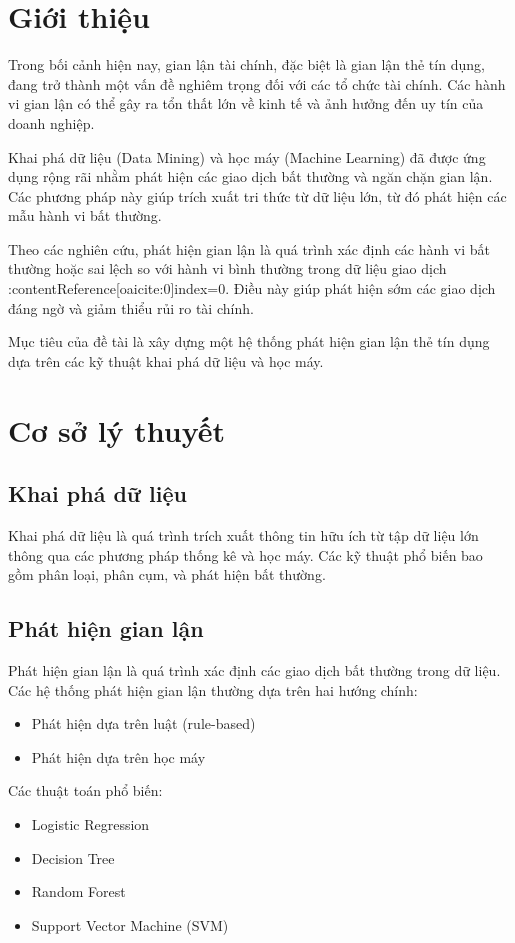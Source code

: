 \section{Giới thiệu}

Trong bối cảnh hiện nay, gian lận tài chính, đặc biệt là gian lận thẻ tín dụng, đang trở thành một vấn đề nghiêm trọng đối với các tổ chức tài chính. Các hành vi gian lận có thể gây ra tổn thất lớn về kinh tế và ảnh hưởng đến uy tín của doanh nghiệp.

Khai phá dữ liệu (Data Mining) và học máy (Machine Learning) đã được ứng dụng rộng rãi nhằm phát hiện các giao dịch bất thường và ngăn chặn gian lận. Các phương pháp này giúp trích xuất tri thức từ dữ liệu lớn, từ đó phát hiện các mẫu hành vi bất thường.

Theo các nghiên cứu, phát hiện gian lận là quá trình xác định các hành vi bất thường hoặc sai lệch so với hành vi bình thường trong dữ liệu giao dịch :contentReference[oaicite:0]{index=0}. Điều này giúp phát hiện sớm các giao dịch đáng ngờ và giảm thiểu rủi ro tài chính.

Mục tiêu của đề tài là xây dựng một hệ thống phát hiện gian lận thẻ tín dụng dựa trên các kỹ thuật khai phá dữ liệu và học máy.
\section{Cơ sở lý thuyết}

\subsection{Khai phá dữ liệu}
Khai phá dữ liệu là quá trình trích xuất thông tin hữu ích từ tập dữ liệu lớn thông qua các phương pháp thống kê và học máy. Các kỹ thuật phổ biến bao gồm phân loại, phân cụm, và phát hiện bất thường.

\subsection{Phát hiện gian lận}
Phát hiện gian lận là quá trình xác định các giao dịch bất thường trong dữ liệu. Các hệ thống phát hiện gian lận thường dựa trên hai hướng chính:
\begin{itemize}
    \item Phát hiện dựa trên luật (rule-based)
    \item Phát hiện dựa trên học máy
\end{itemize}

Các thuật toán phổ biến:
\begin{itemize}
    \item Logistic Regression
    \item Decision Tree
    \item Random Forest
    \item Support Vector Machine (SVM)
\end{itemize}

